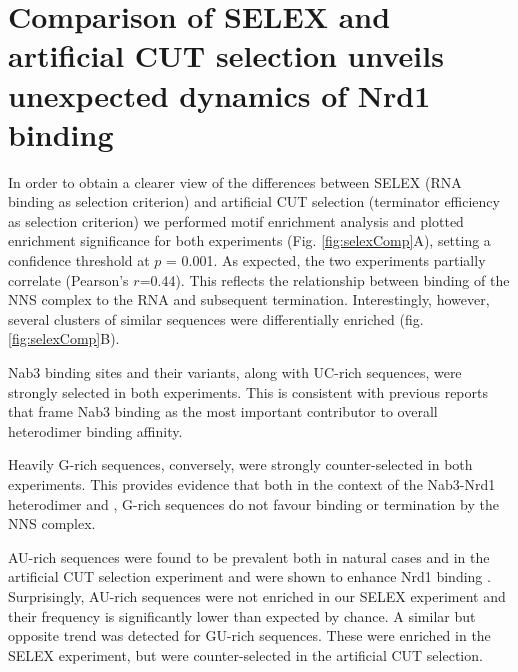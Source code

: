 \section{Comparison of SELEX and \invivo{} artificial CUT selection unveils unexpected dynamics of Nrd1 binding}
\doublespacing
In order to obtain a clearer view of the differences between \invitro{} SELEX (RNA binding as selection criterion) and artificial CUT selection (terminator efficiency as selection criterion) we performed motif enrichment analysis and plotted enrichment significance for both experiments (Fig. \ref{fig:selexComp}A), setting a confidence threshold at $p$ = 0.001. As expected, the two experiments partially correlate (Pearson's $r$=0.44). This reflects the relationship between binding of the NNS complex to the RNA and subsequent termination. Interestingly, however, several clusters of similar sequences were differentially enriched (fig. \ref{fig:selexComp}B). 

Nab3 binding sites and their variants, along with UC-rich sequences, were strongly selected in both experiments. This is consistent with previous reports that frame Nab3 binding as the most important contributor to overall heterodimer binding affinity.

Heavily G-rich sequences, conversely, were strongly counter-selected in both experiments. This provides evidence that both in the context of the Nab3-Nrd1 heterodimer and \invivo{}, G-rich sequences do not favour binding  or termination by the NNS complex.

AU-rich sequences were found to be prevalent both in natural cases and in the artificial CUT selection experiment and were shown to enhance Nrd1 binding \cite{porrua:2012:in}. Surprisingly, AU-rich sequences were not enriched in our SELEX experiment and their frequency is significantly lower than expected by chance. A similar but opposite trend was detected for GU-rich sequences. These were enriched in the SELEX experiment, but were counter-selected in the artificial CUT selection. 


